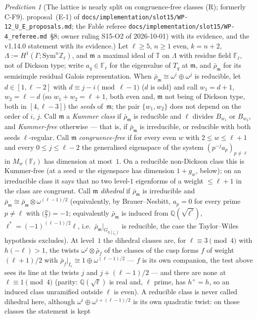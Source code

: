 \documentclass[11pt]{article}
\theoremstyle{remark}
\newtheorem{prediction}[theorem]{Prediction}
\newcommand{\F}{\mathbb{F}}
\newcommand{\Z}{\mathbb{Z}}
\newcommand{\Q}{\mathbb{Q}}
\newcommand{\Sym}{\mathrm{Sym}}
\newcommand{\Ga}{\Gamma}
\newcommand{\Fl}{\F_\ell}
\newcommand{\T}{\mathbb{T}}
\newcommand{\m}{\mathfrak{m}}
\begin{document}
\begin{prediction}[The lattice is nearly split on congruence-free classes (R); formerly C-F9]
proposal~(E-1) of \texttt{docs/implementation/slot15/WP-12\_U\_E\_proposals.md}; the Fable referee \texttt{docs/implementation/slot15/WP-4\_referee.md}~\S8;
owner ruling S15-O2 of 2026-10-01) with its evidence, and the v1.14.0 statement with its evidence.)
Let $\ell\ge5$, $n\ge1$ even, $k=n+2$, $\Lambda:=H^1(\Ga;\Sym^n\Z_\ell)$, and $\m$ a maximal ideal of $\T$ on $\Lambda$ with residue field $\Fl$, not
of Dickson type; write $a_q\in\Fl$ for the eigenvalue of $T_q$ at $\m$, and $\bar\rho_\m$ for its semisimple residual Galois representation. When
$\bar\rho_\m\cong\omega^i\oplus\omega^j$ is reducible, let $d\in[1,\ell-2]$ with $d\equiv j-i\pmod{\ell-1}$ ($d$ is odd) and call $w_1=d+1$, $w_2=\ell-d$
(so $w_1+w_2=\ell+1$, both even and, $\m$ not being of Dickson type, both in $[4,\ell-3]$) the \emph{seeds} of~$\m$; the pair $\{w_1,w_2\}$ does not depend on
the order of $i$, $j$. Call $\m$ a \emph{Kummer class} if $\bar\rho_\m$ is reducible and $\ell$ divides $B_{w_1}$ or $B_{w_2}$, and \emph{Kummer-free}
otherwise --- that is, if $\bar\rho_\m$ is irreducible, or reducible with both seeds $\ell$-regular. Call $\m$ \emph{congruence-free} if for every even $w$
with $2\le w\le\ell+1$ and every $0\le j\le\ell-2$ the generalised eigenspace of the system $(p^{-j}a_p)_{p\ne\ell}$ in $M_w(\Fl)$ has dimension at most~$1$.
On a reducible non-Dickson class this is Kummer-free (at a seed $w$ the eigenspace has dimension $1+g_w$, below); on an irreducible class it says that no two
level-$1$ eigenforms of a weight $\le\ell+1$ in the class are congruent.
Call $\m$ \emph{dihedral} if $\bar\rho_\m$ is irreducible and $\bar\rho_\m\cong\bar\rho_\m\otimes\omega^{(\ell-1)/2}$
(equivalently, by Brauer--Nesbitt, $a_p=0$ for every prime $p\ne\ell$ with $\bigl(\tfrac{p}{\ell}\bigr)=-1$; equivalently
$\bar\rho_\m$ is induced from $\Q(\sqrt{\ell^{*}})$, $\ell^{*}=(-1)^{(\ell-1)/2}\ell$, i.e.\ $\bar\rho_\m|_{G_{\Q(\zeta_\ell)}}$ is
reducible, the case the Taylor--Wiles hypothesis excludes). At level~$1$ the dihedral classes are, for $\ell\equiv3\pmod4$
with $h(-\ell)>1$, the twists $\omega^{j}\otimes\bar\rho_f$ of the classes of the cusp forms $f$ of weight $(\ell+1)/2$ with
$\bar\rho_f|_{I_\ell}\cong1\oplus\omega^{(\ell-1)/2}$ --- $f$ is its own companion, the test above sees its line at the twists
$j$ and $j+(\ell-1)/2$ --- and there are none at $\ell\equiv1\pmod4$ (parity: $\Q(\sqrt\ell)$ is real and, $\ell$ prime, has $h^{+}=h$, so an induced class unramified outside $\ell$ is even). A reducible class is never called dihedral
here, although $\omega^{i}\oplus\omega^{i+(\ell-1)/2}$ is its own quadratic twist: on those classes the statement is kept

\end{prediction}
\end{document}
